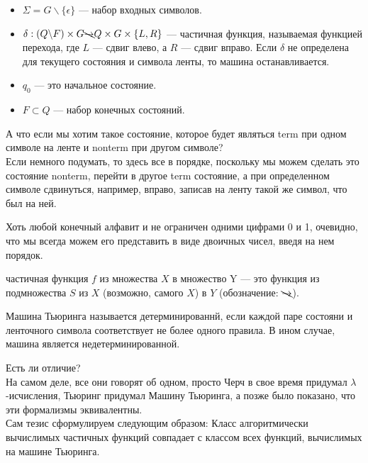 \begin{Def}
\begin{itemize}
        \item $\Sigma = G \backslash \{\epsilon\}$ --- набор входных символов.
        \item $\delta : (Q \backslash F) \times G \bcancel{\rightarrow}
        Q \times G \times \{L, R\}$ --- частичная функция, называемая функцией перехода, где $L$ --- сдвиг влево, а $R$ --- сдвиг вправо. Если $\delta$ не определена для текущего состояния и символа ленты, то машина останавливается.
        \item $q_0$ --- это начальное состояние.
        \item $F \subset {Q}$  --- набор конечных состояний.
        \end{itemize}
    \end{Def} 
    \begin{Rem}
        А что если мы хотим такое состояние, которое будет являться term при одном символе на ленте и nonterm при другом символе?\\
        Если немного подумать, то здесь все в порядке, поскольку мы можем сделать это состояние nonterm, перейти в другое term состояние, а при определенном символе сдвинуться, например, вправо, записав на ленту такой же символ, что был на ней.
    \end{Rem}
    \begin{Rem}
        Хоть любой конечный алфавит и не ограничен одними цифрами 0 и 1, очевидно, что мы всегда можем его представить в виде двоичных чисел, введя на нем порядок.
    \end{Rem}
    \begin{Def}
        частичная функция $f$ из множества $X$ в множество Y --- это функция из подмножества $S$ из $X$ (возможно, самого $X$) в $Y$ (обозначение: $\bcancel{\rightarrow}$). 
    \end{Def}
    \begin{Def}
        Машина Тьюринга называется детерминированнй, если каждой паре состояни и ленточного символа соответствует не более одного правила. В ином случае, машина является недетерминированной.
    \end{Def}
    \begin{Def}
        Есть ли отличие?\\
        На самом деле, все они говорят об одном, просто Черч в свое время придумал $\lambda$-исчисления, Тьюринг придумал Машину Тьюринга, а позже было показано, что эти формализмы эквивалентны.\\
        Сам тезис сформулируем следующим образом: Класс алгоритмически вычислимых частичных функций совпадает с классом всех функций, вычислимых на машине Тьюринга.
    \end{Def}
